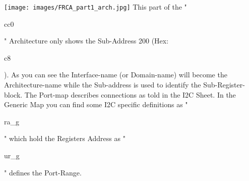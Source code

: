 \documentclass[a4paper,12pt]{report}
\begin{document}
\newline
\texttt{[image: images/FRCA\_part1\_arch.jpg]}\newline
This part of the "\begin{tt}cc0\end{tt}" Architecture only shows the Sub-Address 200 (Hex: \begin{tt}c8\end{tt}). As you can see the Interface-name (or Domain-name) will become the Architecture-name while the Sub-address is used to identify the Sub-Register-block. The Port-map describes connections as told in the I2C Sheet. In the Generic Map you can find some I2C specific definitions as "\begin{tt}ra\_g\end{tt}" which hold the Registers Address as "\begin{tt}ur\_g\end{tt}" defines the Port-Range.
\end{document}

